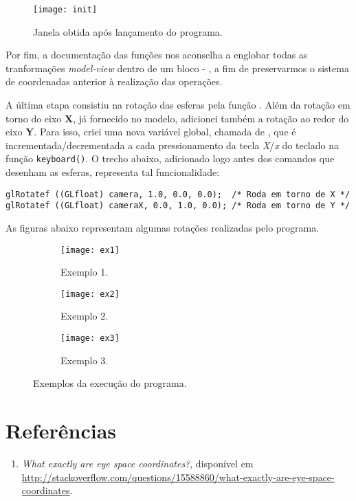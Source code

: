 \documentclass[12pt, a4paper]{article}
\begin{document}
\FloatBarrier

\begin{figure}[h]
    
    \centering
    \texttt{[image: init]}
    \caption {Janela obtida após lançamento do programa.}
    \label{fig:inicializacao}
\end{figure} 

\FloatBarrier

Por fim, a documentação das funções nos aconselha a englobar todas as
tranformações \textit{model-view} dentro de um bloco  -
, a fim de preservarmos o sistema de coordenadas anterior à
realização das operações.

\vspace{12pt}

A última etapa consistiu na rotação das esferas pela função .
Além da rotação em torno do eixo \textbf{X}, já fornecido no modelo, adicionei
também a rotação ao redor do eixo \textbf{Y}. Para isso, criei uma nova variável
global, chamada de , que é incrementada/decrementada a cada
pressionamento da tecla \textit{X}/\textit{x} do teclado na função
\texttt{keyboard()}. O trecho abaixo, adicionado logo antes dos comandos que desenham as esferas, representa tal
funcionalidade:

\begin{lstlisting}[keywordstyle=\ttfamily, style=nonumbers]
glRotatef ((GLfloat) camera, 1.0, 0.0, 0.0);  /* Roda em torno de X */
glRotatef ((GLfloat) cameraX, 0.0, 1.0, 0.0); /* Roda em torno de Y */
\end{lstlisting}

As figuras abaixo representam algumas rotações realizadas pelo programa.

	\FloatBarrier
			    
	\begin{figure}[h!]
	
	\centering
	
		\begin{subfigure}{.33\textwidth}
		  \centering
		  \texttt{[image: ex1]}
		  \caption{\centering Exemplo 1.}
		  
		\end{subfigure}%
		\begin{subfigure}{.33\textwidth}
		  \centering
		  \texttt{[image: ex2]}
		  \caption{\centering Exemplo 2.}
		\end{subfigure}
		\begin{subfigure}{.33\textwidth}
		  \centering
		  \texttt{[image: ex3]}
		  \caption{\centering Exemplo 3.} 
		\end{subfigure}
	
	
	\caption{Exemplos da execução do programa.}
	\end{figure} 
	
	\FloatBarrier

 \section* {Referências}

\begin {enumerate}
  \item 
  \textit  {What exactly are eye space coordinates?}, disponível em
  \url{http://stackoverflow.com/questions/15588860/what-exactly-are-eye-space-coordinates}.
  \end{enumerate}
\end{document}
